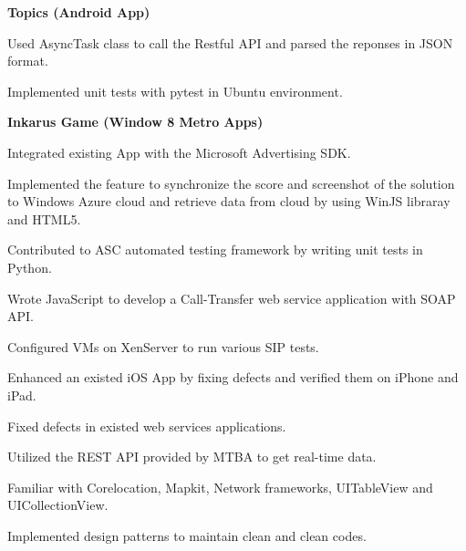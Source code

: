 \documentclass[a4paper]{lyu-resume} %
\begin{document}
\begin{minipage}[t]{0.66\textwidth}
\textbf{Topics (Android App)}
\begin{tightitemize}
\item Used AsyncTask class to call the Restful API and parsed the reponses in JSON format.
\item Implemented unit tests with pytest in Ubuntu environment.
\end{tightitemize}

\vspace{2 mm}
\textbf{Inkarus Game (Window 8 Metro Apps)}
\begin{tightitemize}
\item Integrated existing App with the Microsoft Advertising SDK.
\item Implemented the feature to synchronize the score and screenshot of the solution to Windows Azure cloud and retrieve data from cloud by using WinJS libraray and HTML5.
\end{tightitemize}

\sectionspace %



\begin{tightitemize}
\item Contributed to ASC automated testing framework by writing unit tests in Python.
\item Wrote JavaScript to develop a Call-Transfer web service application with SOAP API.
\item Configured VMs on XenServer to run various SIP tests.
\item Enhanced an existed iOS App by fixing defects and verified them on iPhone and iPad. 
\item Fixed defects in existed web services applications.
\end{tightitemize}


\begin{tightitemize}
\item Utilized the REST API provided by MTBA to get real-time data.
\item Familiar with Corelocation, Mapkit, Network frameworks, UITableView and UICollectionView.
\item Implemented design patterns to maintain clean and clean codes.
\end{tightitemize}


\end{minipage}
\end{document}
